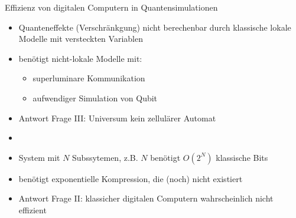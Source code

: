 \documentclass[aspectratio=1610, 9pt]{beamer}
\begin{document}
\begin{frame}{Effizienz von digitalen Computern in Quantensimulationen}
  \begin{itemize}
    \item Quanteneffekte (Verschränkgung) nicht berechenbar durch klassische lokale Modelle mit versteckten Variablen
    \item benötigt nicht-lokale Modelle mit:
    \begin{itemize}
      \item superluminare Kommunikation
      \item aufwendiger Simulation von Qubit
    \end{itemize}
    \item[\rightarrow] Antwort Frage III: Universum kein zellulärer Automat
    \item[]
    \item System mit $N$ Subssytemen, z.B. $N$ benötigt $O(2^N)$ klassische Bits
    \item benötigt exponentielle Kompression, die (noch) nicht existiert
    \item[\rightarrow] Antwort Frage II: klassicher digitalen Computern wahrscheinlich nicht effizient
  \end{itemize}
\end{frame}
\end{document}
